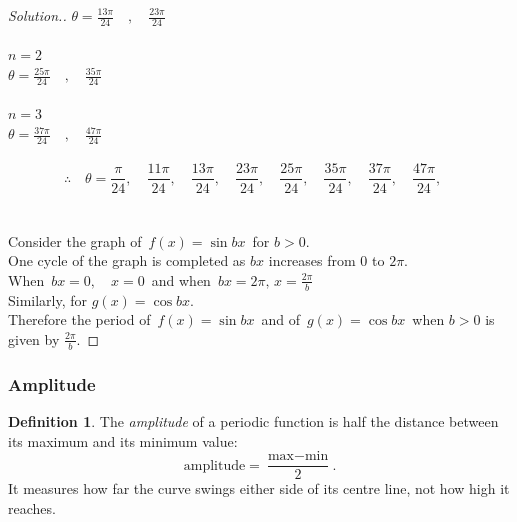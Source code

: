\documentclass[11pt,a4paper]{article}
\theoremstyle{definition}
\newtheorem{definition}[thm]{Definition}
\newenvironment{solution}
  {\renewcommand{\qedsymbol}{}\begin{proof}[\textit{Solution}.]}
  {\end{proof}}
\begin{document}
\begin{solution}
$\theta = \frac{13\pi}{24}\quad , \quad  \frac{23\pi}{24}$\\\\





$n = 2$\\

$\theta = \frac{25\pi}{24}\quad , \quad  \frac{35\pi}{24}$\\\\




$n = 3$\\

$\theta = \frac{37\pi}{24}\quad , \quad  \frac{47\pi}{24}$\\\\





$$\therefore \quad  \theta  = \frac{\pi}{24}, \quad  \frac{11\pi}{24}, \quad  \frac{13\pi}{24}, \quad   \frac{23\pi}{24}, \quad   \frac{25\pi}{24}, \quad   \frac{35\pi}{24}, \quad   \frac{37\pi}{24}, \quad   \frac{47\pi}{24}, \quad $$\\\\











Consider the graph of $\, f(x) = \sin bx\,$ for $b> 0$.\\
One cycle of the graph is completed as $bx$ increases from 0 to $2\pi$.\\
When $\, bx = 0, \quad  x = 0\,$ and when $\, bx = 2\pi, \, x = \frac{2\pi}{b}$\\

Similarly, for $g(x) = \cos bx$.\\
Therefore the period of $\, f(x) = \sin bx\,$ and of $\, g(x) = \cos bx\,$ when $b> 0$ is given by $\frac{2\pi}{b}$.
\end{solution}
\subsubsection{Amplitude}

\begin{definition}
The \emph{amplitude} of a periodic function is half the distance between its
maximum and its minimum value:
$$\text{amplitude}=\frac{\text{max}-\text{min}}{2} .$$
It measures how far the curve swings either side of its centre line, not how high
it reaches.
\end{definition}
\end{document}
